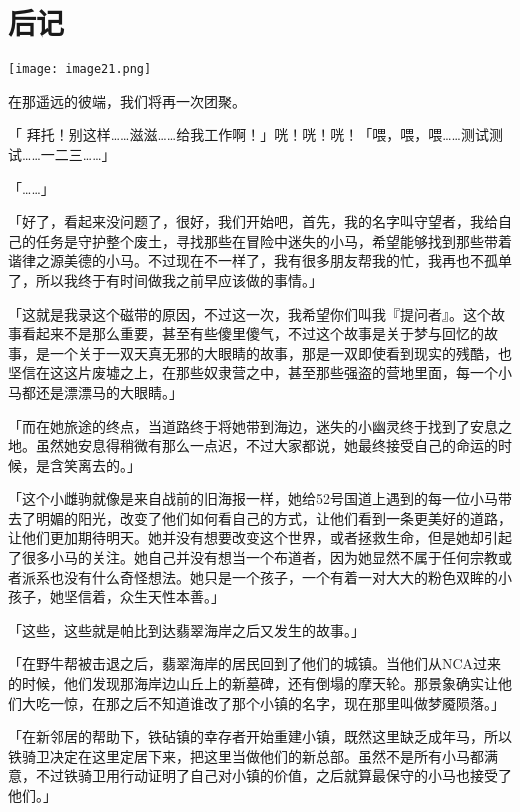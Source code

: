 \chapter{后记}

\texttt{[image: image21.png]}

\begin{intro}
    在那遥远的彼端，我们将再一次团聚。
\end{intro}

{\rt

「 拜托！别这样……滋滋……给我工作啊！」咣！咣！咣！「喂，喂，喂……测试测试……一二三……」

「……」

「好了，看起来没问题了，很好，我们开始吧，首先，我的名字叫守望者，我给自己的任务是守护整个废土，寻找那些在冒险中迷失的小马，希望能够找到那些带着谐律之源美德的小马。不过现在不一样了，我有很多朋友帮我的忙，我再也不孤单了，所以我终于有时间做我之前早应该做的事情。」

「这就是我录这个磁带的原因，不过这一次，我希望你们叫我『提问者』。这个故事看起来不是那么重要，甚至有些傻里傻气，不过这个故事是关于梦与回忆的故事，是一个关于一双天真无邪的大眼睛的故事，那是一双即使看到现实的残酷，也坚信在这这片废墟之上，在那些奴隶营之中，甚至那些强盗的营地里面，每一个小马都还是漂漂马的大眼睛。」

「而在她旅途的终点，当道路终于将她带到海边，迷失的小幽灵终于找到了安息之地。虽然她安息得稍微有那么一点迟，不过大家都说，她最终接受自己的命运的时候，是含笑离去的。」

「这个小雌驹就像是来自战前的旧海报一样，她给52号国道上遇到的每一位小马带去了明媚的阳光，改变了他们如何看自己的方式，让他们看到一条更美好的道路，让他们更加期待明天。她并没有想要改变这个世界，或者拯救生命，但是她却引起了很多小马的关注。她自己并没有想当一个布道者，因为她显然不属于任何宗教或者派系也没有什么奇怪想法。她只是一个孩子，一个有着一对大大的粉色双眸的小孩子，她坚信着，众生天性本善。」

「这些，这些就是帕比到达翡翠海岸之后又发生的故事。」

「在野牛帮被击退之后，翡翠海岸的居民回到了他们的城镇。当他们从NCA过来的时候，他们发现那海岸边山丘上的新墓碑，还有倒塌的摩天轮。那景象确实让他们大吃一惊，在那之后不知道谁改了那个小镇的名字，现在那里叫做梦魇陨落。」

「在新邻居的帮助下，铁砧镇的幸存者开始重建小镇，既然这里缺乏成年马，所以铁骑卫决定在这里定居下来，把这里当做他们的新总部。虽然不是所有小马都满意，不过铁骑卫用行动证明了自己对小镇的价值，之后就算最保守的小马也接受了他们。」

}
